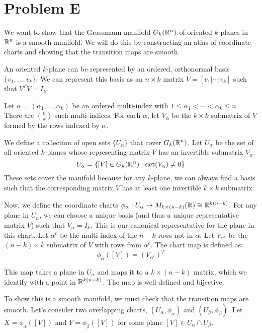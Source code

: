 \documentclass[12pt,letterpaper]{article}
\begin{document}
\clearpage

\section*{Problem E}

We want to show that the Grassmann manifold $G_k(\mathbb{R}^n)$ of oriented $k$-planes in $\mathbb{R}^n$ is a smooth manifold. We will do this by constructing an atlas of coordinate charts and showing that the transition maps are smooth.

An oriented $k$-plane can be represented by an ordered, orthonormal basis $\{v_1, \ldots, v_k\}$. We can represent this basis as an $n \times k$ matrix $V = [v_1 | \cdots | v_k]$ such that $V^T V = I_k$.

Let $\alpha = (\alpha_1, \ldots, \alpha_k)$ be an ordered multi-index with $1 \le \alpha_1 < \cdots < \alpha_k \le n$. There are $\binom{n}{k}$ such multi-indices. For each $\alpha$, let $V_\alpha$ be the $k \times k$ submatrix of $V$ formed by the rows indexed by $\alpha$.

We define a collection of open sets $\{U_\alpha\}$ that cover $G_k(\mathbb{R}^n)$. Let $U_\alpha$ be the set of all oriented $k$-planes whose representing matrix $V$ has an invertible submatrix $V_\alpha$.
\[ U_\alpha = \{ [V] \in G_k(\mathbb{R}^n) : \det(V_\alpha) \neq 0 \} \]
These sets cover the manifold because for any $k$-plane, we can always find a basis such that the corresponding matrix $V$ has at least one invertible $k \times k$ submatrix.

Now, we define the coordinate charts $\phi_\alpha: U_\alpha \to M_{k \times (n-k)}(\mathbb{R}) \cong \mathbb{R}^{k(n-k)}$. For any plane in $U_\alpha$, we can choose a unique basis (and thus a unique representative matrix $V$) such that $V_\alpha = I_k$. This is our canonical representative for the plane in this chart. Let $\alpha^c$ be the multi-index of the $n-k$ rows not in $\alpha$. Let $V_{\alpha^c}$ be the $(n-k) \times k$ submatrix of $V$ with rows from $\alpha^c$. The chart map is defined as:
\[ \phi_\alpha([V]) = (V_{\alpha^c})^T \]

This map takes a plane in $U_\alpha$ and maps it to a $k \times (n-k)$ matrix, which we identify with a point in $\mathbb{R}^{k(n-k)}$. The map is well-defined and bijective.

To show this is a smooth manifold, we must check that the transition maps are smooth. Let's consider two overlapping charts, $(U_\alpha, \phi_\alpha)$ and $(U_\beta, \phi_\beta)$. Let $X = \phi_\alpha([V])$ and $Y = \phi_\beta([V])$ for some plane $[V] \in U_\alpha \cap U_\beta$.
\end{document}
